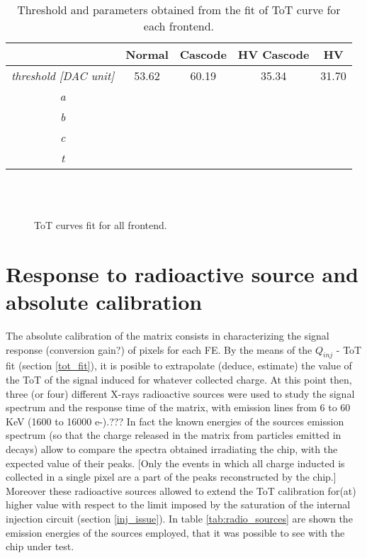 \begin{table}[h!]
\centering
\begin{tabular}{c|c|c|c|c}
 & \textbf{Normal} & \textbf{Cascode} & \textbf{HV Cascode} & \textbf{HV} \\
\hline
\textit{threshold [DAC unit]} & 53.62 & 60.19 & 35.34 & 31.70 \\
\textit{a} & & & & \\
\textit{b} & & & & \\
\textit{c} & & & & \\
\textit{t} & & & & \\
\end{tabular}
\caption{Threshold and parameters obtained from the fit of ToT curve for each frontend.}
\label{tab:th_fe}
\end{table}

\begin{figure}[h!]
\centering
{}\quad
{}\\
\quad
{}\\
\caption{ToT curves fit for all frontend.}
\label{fig:tot_fe}
\end{figure}


\section{Response to radioactive source and absolute calibration} \label{source_ana}


The absolute calibration of the matrix consists in characterizing the signal response (conversion gain?) of pixels for each FE. By the means of the $Q_{inj}$ - ToT fit (section \ref{tot_fit}), it is posible to extrapolate (deduce, estimate) the value of the ToT of the signal induced for whatever collected charge. At this point then, three (or four) different X-rays radioactive sources were used to study the signal spectrum and the response time of the matrix, with emission lines from 6 to 60 KeV (1600 to 16000 e-).??? 
In fact the known energies of the sources emission spectrum (so that the charge released in the matrix from particles emitted in decays) allow to compare the spectra obtained irradiating the chip, with the expected value of their peaks. [Only the events in which all charge inducted is collected in a single pixel are a part of the peaks reconstructed by the chip.]\\
Moreover these radioactive sources allowed to extend the ToT calibration for(at) higher value with respect to the limit imposed by the saturation of the internal injection circuit (section \ref{inj_issue}). In table \vref{tab:radio_sources} are shown the emission energies of the sources employed, that it was possible to see with the chip under test.


